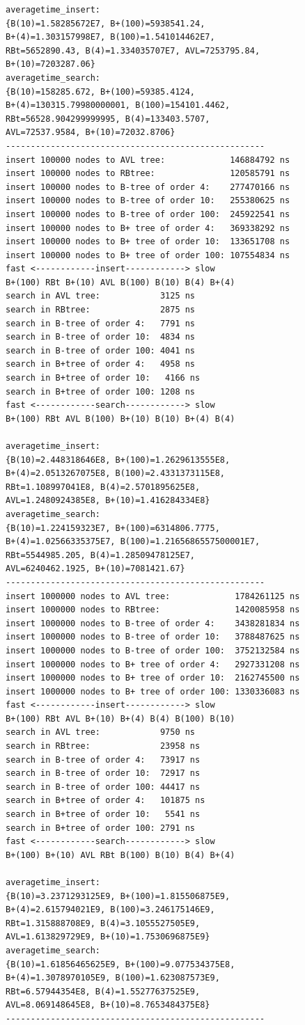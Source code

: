 \documentclass{article}
\begin{document}
\begin{verbatim}
averagetime_insert:
{B(10)=1.58285672E7, B+(100)=5938541.24, 
B+(4)=1.303157998E7, B(100)=1.541014462E7, 
RBt=5652890.43, B(4)=1.334035707E7, AVL=7253795.84, 
B+(10)=7203287.06}
averagetime_search:
{B(10)=158285.672, B+(100)=59385.4124, 
B+(4)=130315.79980000001, B(100)=154101.4462, 
RBt=56528.904299999995, B(4)=133403.5707, 
AVL=72537.9584, B+(10)=72032.8706}
----------------------------------------------------
insert 100000 nodes to AVL tree:             146884792 ns
insert 100000 nodes to RBtree:               120585791 ns
insert 100000 nodes to B-tree of order 4:    277470166 ns
insert 100000 nodes to B-tree of order 10:   255380625 ns
insert 100000 nodes to B-tree of order 100:  245922541 ns
insert 100000 nodes to B+ tree of order 4:   369338292 ns
insert 100000 nodes to B+ tree of order 10:  133651708 ns
insert 100000 nodes to B+ tree of order 100: 107554834 ns
fast <------------insert------------> slow
B+(100) RBt B+(10) AVL B(100) B(10) B(4) B+(4) 
search in AVL tree:            3125 ns
search in RBtree:              2875 ns
search in B-tree of order 4:   7791 ns
search in B-tree of order 10:  4834 ns
search in B-tree of order 100: 4041 ns
search in B+tree of order 4:   4958 ns
search in B+tree of order 10:   4166 ns
search in B+tree of order 100: 1208 ns
fast <------------search------------> slow
B+(100) RBt AVL B(100) B+(10) B(10) B+(4) B(4) 

averagetime_insert:
{B(10)=2.448318646E8, B+(100)=1.2629613555E8, 
B+(4)=2.0513267075E8, B(100)=2.4331373115E8, 
RBt=1.108997041E8, B(4)=2.5701895625E8, 
AVL=1.2480924385E8, B+(10)=1.416284334E8}
averagetime_search:
{B(10)=1.224159323E7, B+(100)=6314806.7775, 
B+(4)=1.02566335375E7, B(100)=1.2165686557500001E7, 
RBt=5544985.205, B(4)=1.28509478125E7, 
AVL=6240462.1925, B+(10)=7081421.67}
----------------------------------------------------
insert 1000000 nodes to AVL tree:             1784261125 ns
insert 1000000 nodes to RBtree:               1420085958 ns
insert 1000000 nodes to B-tree of order 4:    3438281834 ns
insert 1000000 nodes to B-tree of order 10:   3788487625 ns
insert 1000000 nodes to B-tree of order 100:  3752132584 ns
insert 1000000 nodes to B+ tree of order 4:   2927331208 ns
insert 1000000 nodes to B+ tree of order 10:  2162745500 ns
insert 1000000 nodes to B+ tree of order 100: 1330336083 ns
fast <------------insert------------> slow
B+(100) RBt AVL B+(10) B+(4) B(4) B(100) B(10) 
search in AVL tree:            9750 ns
search in RBtree:              23958 ns
search in B-tree of order 4:   73917 ns
search in B-tree of order 10:  72917 ns
search in B-tree of order 100: 44417 ns
search in B+tree of order 4:   101875 ns
search in B+tree of order 10:   5541 ns
search in B+tree of order 100: 2791 ns
fast <------------search------------> slow
B+(100) B+(10) AVL RBt B(100) B(10) B(4) B+(4) 

averagetime_insert:
{B(10)=3.2371293125E9, B+(100)=1.815506875E9, 
B+(4)=2.615794021E9, B(100)=3.246175146E9, 
RBt=1.315888708E9, B(4)=3.1055527505E9, 
AVL=1.613829729E9, B+(10)=1.7530696875E9}
averagetime_search:
{B(10)=1.61856465625E9, B+(100)=9.077534375E8, 
B+(4)=1.3078970105E9, B(100)=1.623087573E9, 
RBt=6.57944354E8, B(4)=1.55277637525E9, 
AVL=8.069148645E8, B+(10)=8.7653484375E8}
----------------------------------------------------
\end{verbatim}
\end{document}
